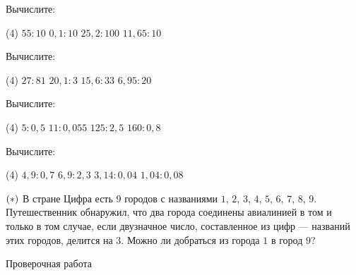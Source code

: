 \begin{homework}[number=2]
	\begin{listofex}
		\item Вычислите:
	\begin{tasks}(4)
		\task \( 55:10 \) 
		\task \( 0,1:10 \)
		\task \( 25,2:100 \)
		\task \( 11,65:10 \)
	\end{tasks}
		\item Вычислите:
		\begin{tasks}(4)
			\task \( 27:81 \)
			\task \( 20,1:3 \)
			\task \( 15,6:33 \)
			\task \( 6,95:20 \)
		\end{tasks}
		\item Вычислите:
		\begin{tasks}(4)
			\task \( 5:0,5 \) 
			\task \( 11:0,055 \)
			\task \( 125:2,5 \)
			\task \( 160:0,8 \)
		\end{tasks}
		\item Вычислите:
		\begin{tasks}(4)
			\task \( 4,9:0,7 \) 
			\task \( 6,9:2,3 \)
			\task \( 3,14:0,04 \)
			\task \( 1,04:0,08 \)
		\end{tasks}
		\item \( \left( {\LARGE *} \right) \) В стране Цифра есть \( 9 \) городов с названиями \( 1 \), \( 2 \), \( 3 \), \( 4 \), \( 5 \), \( 6 \), \( 7 \), \( 8 \), \( 9 \). Путешественник обнаружил, что два города соединены авиалинией в том и только в том случае, если двузначное число, составленное из цифр --- названий этих городов, делится на \( 3 \). Можно ли добраться из города \( 1 \) в город \( 9 \)?
		
	\end{listofex}
\end{homework}

\begin{exam}
	\begin{listofex}
		\item Проверочная работа
	\end{listofex}
\end{exam}
